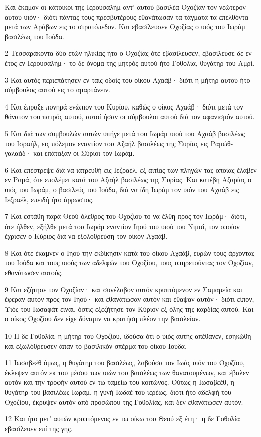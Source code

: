 \par Και έκαμον οι κάτοικοι της Ιερουσαλήμ αντ' αυτού βασιλέα Οχοζίαν τον νεώτερον αυτού υιόν· διότι πάντας τους πρεσβυτέρους εθανάτωσαν τα τάγματα τα επελθόντα μετά των Αράβων εις το στρατόπεδον. Και εβασίλευσεν Οχοζίας ο υιός του Ιωράμ βασιλέως του Ιούδα.
\par 2 Τεσσαράκοντα δύο ετών ηλικίας ήτο ο Οχοζίας ότε εβασίλευσεν, εβασίλευσε δε εν έτος εν Ιερουσαλήμ· το δε όνομα της μητρός αυτού ήτο Γοθολία, θυγάτηρ του Αμρί.
\par 3 Και αυτός περιεπάτησεν εν ταις οδοίς του οίκου Αχαάβ· διότι η μήτηρ αυτού ήτο σύμβουλος αυτού εις το αμαρτάνειν.
\par 4 Και έπραξε πονηρά ενώπιον του Κυρίου, καθώς ο οίκος Αχαάβ· διότι μετά τον θάνατον του πατρός αυτού, αυτοί ήσαν οι σύμβουλοι αυτού διά τον αφανισμόν αυτού.
\par 5 Και διά των συμβουλών αυτών υπήγε μετά του Ιωράμ υιού του Αχαάβ βασιλέως του Ισραήλ, εις πόλεμον εναντίον του Αζαήλ βασιλέως της Συρίας εις Ραμώθ-γαλαάδ· και επάταξαν οι Σύριοι τον Ιωράμ.
\par 6 Και επέστρεψε διά να ιατρευθή εις Ιεζραέλ, εξ αιτίας των πληγών τας οποίας έλαβεν εν Ραμά, ότε επολέμει κατά του Αζαήλ βασιλέως της Συρίας. Και κατέβη Αζαρίας ο υιός του Ιωράμ, ο βασιλεύς του Ιούδα, διά να ίδη Ιωράμ τον υιόν του Αχαάβ εις Ιεζραέλ, επειδή ήτο άρρωστος.
\par 7 Και εστάθη παρά Θεού όλεθρος του Οχοζίου το να έλθη προς τον Ιωράμ· διότι, ότε ήλθεν, εξήλθε μετά του Ιωράμ εναντίον Ιηού του υιού του Νιμσί, τον οποίον έχρισεν ο Κύριος διά να εξολοθρεύση τον οίκον Αχαάβ.
\par 8 Και ότε έκαμνεν ο Ιηού την εκδίκησιν κατά του οίκου Αχαάβ, ευρών τους άρχοντας του Ιούδα και τους υιούς των αδελφών του Οχοζίου, τους υπηρετούντας τον Οχοζίαν, εθανάτωσεν αυτούς.
\par 9 Και εζήτησε τον Οχοζίαν· και συνέλαβον αυτόν κρυπτόμενον εν Σαμαρεία και έφεραν αυτόν προς τον Ιηού· και εθανάτωσαν αυτόν και έθαψαν αυτόν· διότι είπον, Υιός του Ιωσαφάτ είναι, όστις εξεζήτησε τον Κύριον εξ όλης της καρδίας αυτού. Και ο οίκος Οχοζίου δεν είχε δύναμιν να κρατήση πλέον την βασιλείαν.
\par 10 Η δε Γοθολία, η μήτηρ του Οχοζίου, ιδούσα ότι ο υιός αυτής απέθανεν, εσηκώθη και εξωλόθρευσεν άπαν το βασιλικόν σπέρμα του οίκου Ιούδα.
\par 11 Ιωσαβεέθ όμως, η θυγάτηρ του βασιλέως, λαβούσα τον Ιωάς υιόν του Οχοζίου, έκλεψεν αυτόν εκ του μέσου των υιών του βασιλέως των θανατουμένων, και έβαλεν αυτόν και την τροφήν αυτού εν τω ταμείω του κοιτώνος. Ούτως η Ιωσαβεέθ, η θυγάτηρ του βασιλέως Ιωράμ, η γυνή Ιωδαέ του ιερέως, διότι ήτο αδελφή του Οχοζίου, έκρυψεν αυτόν από προσώπου της Γοθολίας, και δεν εθανάτωσεν αυτόν.
\par 12 Και ήτο μετ' αυτών κρυπτόμενος εν τω οίκω του Θεού εξ έτη· η δε Γοθολία εβασίλευεν επί της γης.

